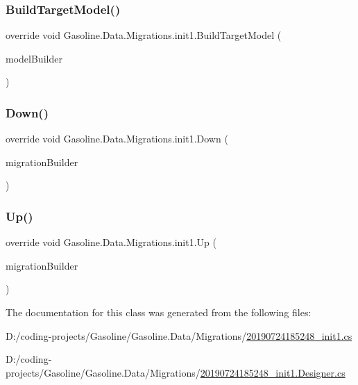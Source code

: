 \subsubsection{\texorpdfstring{BuildTargetModel()}{BuildTargetModel()}}
{\footnotesize\ttfamily override void Gasoline.\+Data.\+Migrations.\+init1.\+Build\+Target\+Model (\begin{DoxyParamCaption}\item[{Model\+Builder}]{model\+Builder }\end{DoxyParamCaption})\hspace{0.3cm}{\ttfamily [protected]}}

\mbox{\label{class_gasoline_1_1_data_1_1_migrations_1_1init1_aa03798c02b939526f786d1edc9148dfa}} 
\subsubsection{\texorpdfstring{Down()}{Down()}}
{\footnotesize\ttfamily override void Gasoline.\+Data.\+Migrations.\+init1.\+Down (\begin{DoxyParamCaption}\item[{Migration\+Builder}]{migration\+Builder }\end{DoxyParamCaption})\hspace{0.3cm}{\ttfamily [protected]}}

\mbox{\label{class_gasoline_1_1_data_1_1_migrations_1_1init1_a8f728b84f0566a2eaedc038620db0909}} 
\subsubsection{\texorpdfstring{Up()}{Up()}}
{\footnotesize\ttfamily override void Gasoline.\+Data.\+Migrations.\+init1.\+Up (\begin{DoxyParamCaption}\item[{Migration\+Builder}]{migration\+Builder }\end{DoxyParamCaption})\hspace{0.3cm}{\ttfamily [protected]}}



The documentation for this class was generated from the following files\+:\begin{DoxyCompactItemize}
\item 
D\+:/coding-\/projects/\+Gasoline/\+Gasoline.\+Data/\+Migrations/\mbox{\hyperlink{20190724185248__init1_8cs}{20190724185248\+\_\+init1.\+cs}}\item 
D\+:/coding-\/projects/\+Gasoline/\+Gasoline.\+Data/\+Migrations/\mbox{\hyperlink{20190724185248__init1_8_designer_8cs}{20190724185248\+\_\+init1.\+Designer.\+cs}}\end{DoxyCompactItemize}
